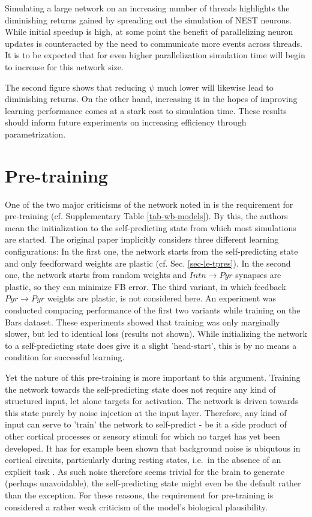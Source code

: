 Simulating a large network on an increasing number of threads highlights the diminishing returns gained by spreading out
the simulation of NEST neurons. While initial speedup is high, at some point the benefit of parallelizing neuron updates
is counteracted by the need to communicate more events across threads. It is to be expected that for even higher
parallelization simulation time will begin to increase for this network size.

The second figure shows that reducing $\psi$ much lower will likewise lead to diminishing returns. On the other hand,
increasing it in the hopes of improving learning performance comes at a stark cost to simulation time. These results
should inform future experiments on increasing efficiency through parametrization.

\section{Pre-training}

One of the two major criticisms of the network noted in \citep{whittington2019theories} is the requirement for
pre-training (cf. Supplementary Table \ref{tab-wb-models}). By this, the authors mean the initialization to the
self-predicting state from which most simulations are started. The original paper implicitly considers three different
learning configurations: In the first one, the network starts from the self-predicting state and only feedforward
weights are plastic (cf. Sec. \ref{sec-le-tpres}). In the second one, the network starts from random weights and $Intn
    \rightarrow Pyr$ synapses are plastic, so they can minimize FB error. The third variant, in which feedback $Pyr
    \rightarrow Pyr$ weights are plastic, is not considered here. An experiment was conducted comparing performance of the
first two variants while training on the Bars dataset. These experiments showed that training was only marginally
slower, but led to identical loss (results not shown). While initializing the network to a self-predicting state does
give it a slight 'head-start', this is by no means a condition for successful learning.

Yet the nature of this pre-training is more important to this argument. Training the network towards the self-predicting
state does not require any kind of structured input, let alone targets for activation. The network is driven towards
this state purely by noise injection at the input layer. Therefore, any kind of input can serve to 'train' the network
to self-predict - be it a side product of other cortical processes or sensory stimuli for which no target has yet been
developed. It has for example been shown that background noise is ubiqutous in cortical circuits, particularly during
resting states, i.e.\ in the absence of an explicit task \citep{Deco2009}. As such noise therefore seems trivial for the
brain to generate (perhaps unavoidable), the self-predicting state might even be the default rather than the exception.
For these reasons, the requirement for pre-training is considered a rather weak criticism of the model's biological
plausibility.


